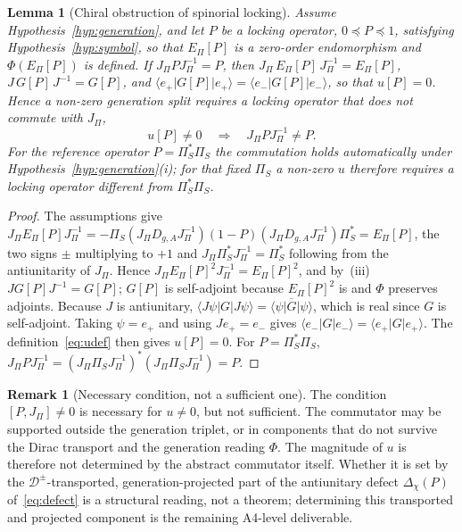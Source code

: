 \documentclass[11pt]{article}
\newtheorem{lemma}{Lemma}
\theoremstyle{definition}
\newtheorem{remark}{Remark}
\newcommand{\EPi}{E_\Pi}
\newcommand{\PiS}{\Pi_S}
\newcommand{\Deff}{\mathcal D}
\begin{document}
    \begin{lemma}[Chiral obstruction of spinorial locking]
      \label{lem:chiral-obstruction}
      Assume Hypothesis~\ref{hyp:generation}, and let $P$ be a locking operator, $0\preceq P\preceq1$, satisfying
      Hypothesis~\ref{hyp:symbol}, so that $\EPi[P]$ is a zero-order endomorphism and $\Phi(\EPi[P])$ is defined.
      If $J_\Pi PJ_\Pi^{-1}=P$, then $J_\Pi\,\EPi[P]\,J_\Pi^{-1}=\EPi[P]$, $J\,G[P]\,J^{-1}=G[P]$, and
      $\langle e_+|G[P]|e_+\rangle=\langle e_-|G[P]|e_-\rangle$, so that $u[P]=0$.
      Hence a non-zero generation split requires a locking operator that does not commute with $J_\Pi$,
      \begin{equation*}
        u[P]\neq0\quad\Longrightarrow\quad J_\Pi PJ_\Pi^{-1}\neq P.
      \end{equation*}
      For the reference operator $P=\PiS^{*}\PiS$ the commutation holds automatically under
      Hypothesis~\ref{hyp:generation}(i); for that fixed $\PiS$ a non-zero $u$ therefore requires a locking operator
      different from $\PiS^{*}\PiS$.
    \end{lemma}

    \begin{proof}
      The assumptions give
      $J_\Pi\EPi[P]J_\Pi^{-1}=-\PiS(J_\Pi D_{g,A}J_\Pi^{-1})(1-P)(J_\Pi D_{g,A}J_\Pi^{-1})\PiS^{*}=\EPi[P]$, the two
      signs
      $\pm$ multiplying to $+1$ and $J_\Pi\PiS^{*}J_\Pi^{-1}=\PiS^{*}$ following from the antiunitarity of $J_\Pi$.
      Hence $J_\Pi\EPi[P]^2J_\Pi^{-1}=\EPi[P]^2$, and by~(iii) $JG[P]J^{-1}=G[P]$; $G[P]$ is self-adjoint because
      $\EPi[P]^2$ is and $\Phi$ preserves adjoints.
      Because $J$ is antiunitary, $\langle J\psi|G|J\psi\rangle=\overline{\langle\psi|G|\psi\rangle}$, which is real
      since $G$ is self-adjoint.
      Taking $\psi=e_+$ and using $Je_+=e_-$ gives $\langle e_-|G|e_-\rangle=\langle e_+|G|e_+\rangle$.
      The definition~\eqref{eq:udef} then gives $u[P]=0$.
      For $P=\PiS^{*}\PiS$, $J_\Pi PJ_\Pi^{-1}=(J_\Pi\PiS J_\Pi^{-1})^{*}(J_\Pi\PiS J_\Pi^{-1})=P$.
    \end{proof}

    \begin{remark}[Necessary condition, not a sufficient one]
      \label{rem:necessary}
      The condition $[P,J_\Pi]\neq0$ is necessary for $u\neq0$, but not sufficient.
      The commutator may be supported outside the generation triplet, or in components that do not survive
      the Dirac transport and the generation reading $\Phi$.
      The magnitude of $u$ is therefore not determined by the abstract commutator itself.
      Whether it is set by the $\Deff^{\pm}$-transported, generation-projected part of the antiunitary defect
      $\Delta_\chi(P)$ of~\eqref{eq:defect} is a structural reading, not a theorem; determining this transported and
      projected component is the remaining A4-level deliverable.
    \end{remark}
\end{document}
